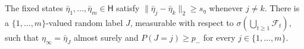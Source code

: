 The fixed states \(\bar\eta_1,\ldots,\bar\eta_m\in\mathsf H\) satisfy \(\|\bar\eta_j-\bar\eta_k\|_2\ge s_\eta\) whenever \(j\ne k\). There is a \(\{1,\ldots,m\}\)-valued random label \(J\), measurable with respect to \(\sigma(\bigcup_{t\ge1}\mathcal F_t)\), such that \(\eta_\infty=\bar\eta_J\) almost surely and \(P(J=j)\ge p_-\) for every \(j\in\{1,\ldots,m\}\).